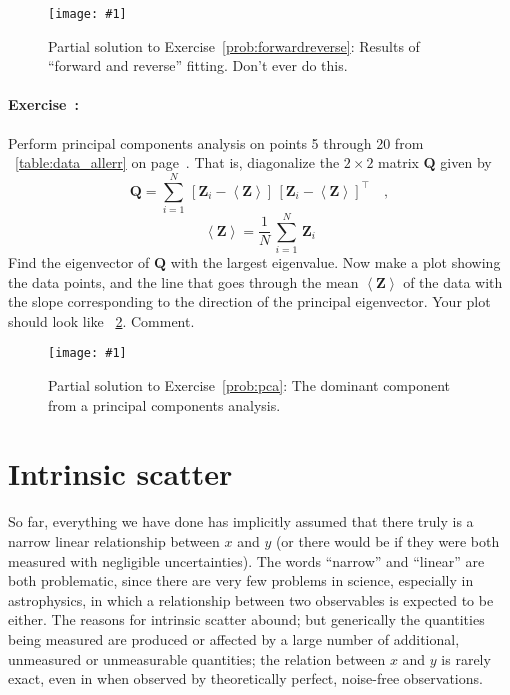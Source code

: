 \documentclass[12pt,twoside]{article}
\newcommand{\exampleplot}[1]{%
\begin{center}%
\texttt{[image: \#1]}%
\end{center}%
}
\newcommand{\problemname}{Exercise}
\newcounter{problem}
\newenvironment{problem}{\paragraph{\problemname~\theproblem:}\refstepcounter{problem}}{}
\newcommand{\mmatrix}[1]{\boldsymbol{#1}}
\newcommand{\transpose}[1]{{#1}^{\scriptscriptstyle \top}}
\newcommand{\mQ}{\mmatrix{Q}}
\newcommand{\mZ}{\mmatrix{Z}}
\newcommand{\mean}[1]{\left<{#1}\right>}
\newcommand{\meanZ}{\mean{\mZ}}
\begin{document}
\begin{figure}[htbp]
\exampleplot{ex14}
\caption{Partial solution to \problemname~\ref{prob:forwardreverse}:
  Results of ``forward and reverse'' fitting.  Don't ever do
  this.}\label{fig:forwardreverse}
\end{figure}

\begin{problem}\label{prob:pca}
Perform principal components analysis on points 5 through 20 from
\tablename~\ref{table:data_allerr} on
page~\pageref{table:data_allerr}.  That is, diagonalize the $2\times
2$ matrix $\mQ$ given by
\begin{equation}
\mQ = \sum_{i=1}^N\,\left[\mZ_i-\meanZ\right]
  \,\transpose{\left[\mZ_i-\meanZ\right]} \quad ,
\end{equation}
\begin{equation}
\meanZ = \frac{1}{N}\,\sum_{i=1}^N\,\mZ_i
\end{equation}
Find the eigenvector of $\mQ$ with the largest eigenvalue.  Now make a
plot showing the data points, and the line that goes through the mean
$\meanZ$ of the data with the slope corresponding to the direction of
the principal eigenvector.  Your plot should look like
\figurename~\ref{fig:pca}.  Comment.
\end{problem}

\begin{figure}[htbp]
\exampleplot{ex15}
\caption{Partial solution to \problemname~\ref{prob:pca}: The dominant
component from a principal components analysis.}\label{fig:pca}
\end{figure}

\section{Intrinsic scatter}\label{sec:scatter}

So far, everything we have done has implicitly assumed that there
truly is a narrow linear relationship between $x$ and $y$ (or there
would be if they were both measured with negligible uncertainties).
The words ``narrow'' and ``linear'' are both problematic, since there
are very few problems in science, especially in astrophysics, in which
a relationship between two observables is expected to be either.  The
reasons for intrinsic scatter abound; but generically the quantities
being measured are produced or affected by a large number of
additional, unmeasured or unmeasurable quantities; the relation
between $x$ and $y$ is rarely exact, even in when observed by
theoretically perfect, noise-free observations.
\end{document}

